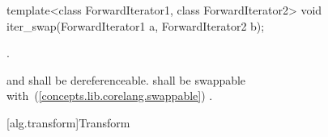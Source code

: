 \begin{removedblock}
%
\begin{itemdecl}
template<class ForwardIterator1, class ForwardIterator2>
  void iter_swap(ForwardIterator1 a, ForwardIterator2 b);
\end{itemdecl}


\begin{itemdescr}
\pnum
\effects
{}.

\pnum
\requires
{} and  shall be dereferenceable.  shall be
swappable with~(\ref{concepts.lib.corelang.swappable}) .
\end{itemdescr}
\end{removedblock}

[alg.transform]{Transform}

